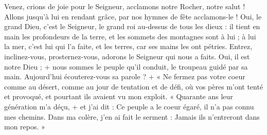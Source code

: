 Venez, crions de joie pour le Seigneur,
acclamons notre Rocher, notre salut !
Allons jusqu'à lui en rendant grâce,
par nos hymnes de fête acclamons-le !
\versseparator
Oui, le grand Dieu, c'est le Seigneur,
le grand roi au-dessus de tous les dieux :
il tient en main les profondeurs de la terre,
et les sommets des montagnes sont à lui ;
à lui la mer, c'est lui qui l'a faite,
et les terres, car ses mains les ont pétries.
\versseparator
Entrez, inclinez-vous, prosternez-vous,
adorons le Seigneur qui nous a faits.
Oui, il est notre Dieu ; +
nous sommes le peuple qu'il conduit,
le troupeau guidé par sa main.
\versseparator
Aujourd'hui écouterez-vous sa parole ? +
« Ne fermez pas votre coeur comme au désert,
comme au jour de tentation et de défi,
où vos pères m'ont tenté et provoqué,
et pourtant ils avaient vu mon exploit.
\versseparator
« Quarante ans leur génération m'a déçu, +
et j'ai dit : Ce peuple a le coeur égaré,
il n'a pas connu mes chemins.
Dans ma colère, j'en ai fait le serment :
Jamais ils n'entreront dans mon repos. »
